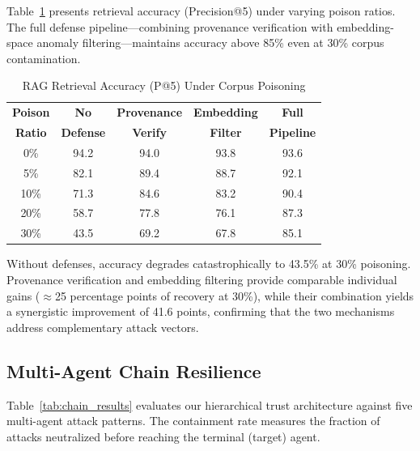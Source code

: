 \documentclass[journal,twoside]{IEEEtran}
\begin{document}
Table~\ref{tab:rag_results} presents retrieval accuracy (Precision@5) under varying poison ratios. The full defense pipeline---combining provenance verification with embedding-space anomaly filtering---maintains accuracy above 85\% even at 30\% corpus contamination.

\begin{table}[!t]
\centering
\caption{RAG Retrieval Accuracy (P@5) Under Corpus Poisoning}
\label{tab:rag_results}
\renewcommand{\arraystretch}{1.15}
\begin{tabular}{@{}ccccc@{}}
\toprule
\textbf{Poison} & \textbf{No} & \textbf{Provenance} & \textbf{Embedding} & \textbf{Full} \\
\textbf{Ratio}   & \textbf{Defense} & \textbf{Verify} & \textbf{Filter} & \textbf{Pipeline} \\
\midrule
0\%  & 94.2 & 94.0 & 93.8 & 93.6 \\
5\%  & 82.1 & 89.4 & 88.7 & 92.1 \\
10\% & 71.3 & 84.6 & 83.2 & 90.4 \\
20\% & 58.7 & 77.8 & 76.1 & 87.3 \\
30\% & 43.5 & 69.2 & 67.8 & 85.1 \\
\bottomrule
\end{tabular}
\end{table}

Without defenses, accuracy degrades catastrophically to 43.5\% at 30\% poisoning. Provenance verification and embedding filtering provide comparable individual gains ($\approx$25 percentage points of recovery at 30\%), while their combination yields a synergistic improvement of 41.6 points, confirming that the two mechanisms address complementary attack vectors.

\subsection{Multi-Agent Chain Resilience}

Table~\ref{tab:chain_results} evaluates our hierarchical trust architecture against five multi-agent attack patterns. The containment rate measures the fraction of attacks neutralized before reaching the terminal (target) agent.
\end{document}
